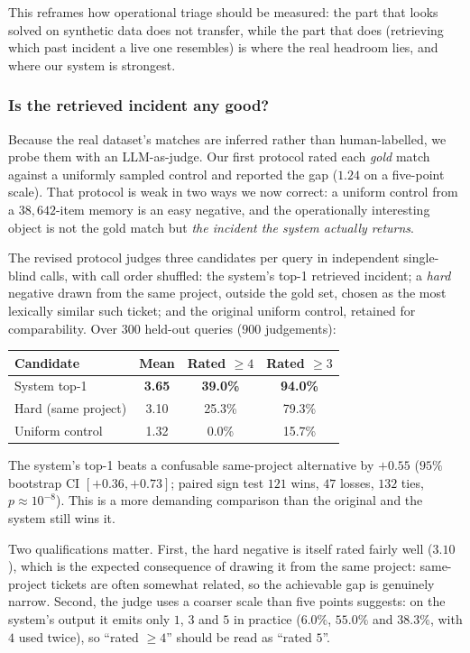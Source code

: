 This reframes how operational triage should be measured: the part that looks solved on synthetic data does not transfer, while the part that does (retrieving which past incident a live one resembles) is where the real headroom lies, and where our system is strongest.

\subsubsection*{Is the retrieved incident any good?}
\label{sec:results-judge}

Because the real dataset's matches are inferred rather than human-labelled, we
probe them with an LLM-as-judge. Our first protocol rated each \emph{gold} match
against a uniformly sampled control and reported the gap ($1.24$ on a five-point
scale). That protocol is weak in two ways we now correct: a uniform control from
a $38{,}642$-item memory is an easy negative, and the operationally interesting
object is not the gold match but \emph{the incident the system actually returns}.

The revised protocol judges three candidates per query in independent
single-blind calls, with call order shuffled: the system's top-1 retrieved
incident; a \emph{hard} negative drawn from the same project, outside the gold
set, chosen as the most lexically similar such ticket; and the original uniform
control, retained for comparability. Over $300$ held-out queries
($900$ judgements):

\begin{center}\footnotesize
\begin{tabular}{lccc}
\toprule
Candidate & Mean & Rated $\ge4$ & Rated $\ge3$ \\
\midrule
System top-1        & \textbf{3.65} & \textbf{39.0\%} & \textbf{94.0\%} \\
Hard (same project) & 3.10 & 25.3\% & 79.3\% \\
Uniform control     & 1.32 & \phantom{0}0.0\% & 15.7\% \\
\bottomrule
\end{tabular}
\end{center}

The system's top-1 beats a confusable same-project alternative by $+0.55$
($95\%$ bootstrap CI $[+0.36,+0.73]$; paired sign test $121$ wins, $47$ losses,
$132$ ties, $p\approx10^{-8}$). This is a more demanding comparison than the
original and the system still wins it.

Two qualifications matter. First, the hard negative is itself rated fairly well
($3.10$), which is the expected consequence of drawing it from the same project:
same-project tickets are often somewhat related, so the achievable gap is
genuinely narrow. Second, the judge uses a coarser scale than five points
suggests: on the system's output it emits only $1$, $3$ and $5$ in practice
($6.0\%$, $55.0\%$ and $38.3\%$, with $4$ used twice), so ``rated $\ge4$''
should be read as ``rated $5$''.

